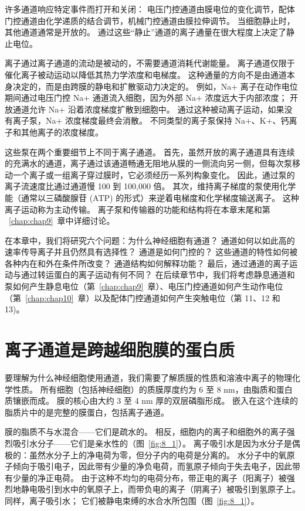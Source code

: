 许多通道响应特定事件而打开和关闭：
电压门控通道由膜电位的变化调节，配体门控通道由化学递质的结合调节，机械门控通道由膜拉伸调节。
当细胞静止时，其他通道通常是开放的。
通过这些“静止”通道的离子通量在很大程度上决定了静止电位。


离子通过离子通道的流动是被动的，不需要通道消耗代谢能量。
离子通道仅限于催化离子被动运动以降低其热力学浓度和电梯度。
这种通量的方向不是由通道本身决定的，而是由跨膜的静电和扩散驱动力决定的。
例如，Na+ 离子在动作电位期间通过电压门控 Na+ 通道流入细胞，因为外部 Na+ 浓度远大于内部浓度；
开放通道允许 Na+ 沿着浓度梯度扩散到细胞中。
通过这种被动离子运动，如果没有离子泵，Na+ 浓度梯度最终会消散。
不同类型的离子泵保持 Na+、K+、钙离子和其他离子的浓度梯度。


这些泵在两个重要细节上不同于离子通道。
首先，虽然开放的离子通道具有连续的充满水的通道，离子通过该通道畅通无阻地从膜的一侧流向另一侧，但每次泵移动一个离子或一组离子穿过膜时，它必须经历一系列构象变化。
因此，通过泵的离子流速度比通过通道慢 100 到 100,000 倍。
其次，维持离子梯度的泵使用化学能（通常以三磷酸腺苷 (ATP) 的形式）来逆着电梯度和化学梯度输送离子。
这种离子运动称为主动传输。
离子泵和传输器的功能和结构将在本章末尾和第 ~\ref{chap:chap9}~章中详细讨论。


在本章中，我们将研究六个问题：为什么神经细胞有通道？
通道如何以如此高的速率传导离子并且仍然具有选择性？ 
通道是如何门控的？
这些通道的特性如何被各种内在和外在条件所改变？
通道结构如何解释功能？
最后，通过通道的离子运动与通过转运蛋白的离子运动有何不同？
在后续章节中，我们将考虑静息通道和泵如何产生静息电位（第~\ref{chap:chap9}~章）、电压门控通道如何产生动作电位（第~\ref{chap:chap10}~章）以及配体门控通道如何产生突触电位（第 11、12 和 13)。



\section{离子通道是跨越细胞膜的蛋白质}

要理解为什么神经细胞使用通道，我们需要了解质膜的性质和溶液中离子的物理化学性质。
所有细胞（包括神经细胞）的质膜厚度约为 6 至 8 nm，由脂质和蛋白质镶嵌而成。
膜的核心由大约 3 至 4 nm 厚的双层磷脂形成。
嵌入在这个连续的脂质片中的是完整的膜蛋白，包括离子通道。


膜的脂质不与水混合——它们是疏水的。
相反，细胞内的离子和细胞外的离子强烈吸引水分子——它们是亲水性的（图~\ref{fig:8_1}）。
离子吸引水是因为水分子是偶极的：虽然水分子上的净电荷为零，但分子内的电荷是分离的。
水分子中的氧原子倾向于吸引电子，因此带有少量的净负电荷，而氢原子倾向于失去电子，因此带有少量的净正电荷。
由于这种不均匀的电荷分布，带正电的离子（阳离子）被强烈地静电吸引到水中的氧原子上，而带负电的离子（阴离子）被吸引到氢原子上。
同样，离子吸引水； 它们被静电束缚的水合水所包围（图~\ref{fig:8_1}）。


